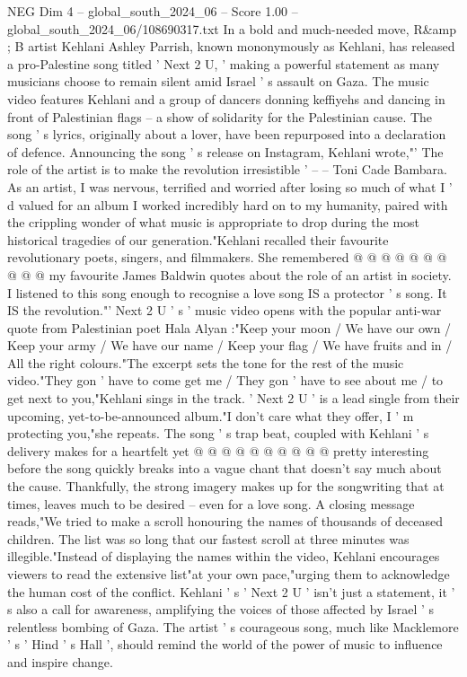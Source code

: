 \begin{textsample}{NEG Dim 4 – global\_south\_2024\_06 – Score 1.00 – global\_south\_2024\_06/108690317.txt}  \label{ex:f4_neg_372}
In a bold and much-needed move, R\&amp ; B artist Kehlani Ashley Parrish, known mononymously as Kehlani, has released a pro-Palestine song titled ' Next 2 U, ' making a powerful statement as many musicians choose to remain silent amid Israel ' s assault on Gaza.
The music video features Kehlani and a group of dancers donning keffiyehs and dancing in front of Palestinian flags -- a show of solidarity for the Palestinian cause.
The song ' s lyrics, originally about a lover, have been repurposed into a declaration of defence.
Announcing the song ' s release on Instagram, Kehlani wrote,"' The role of the artist is to make the revolution irresistible ' -- -- Toni Cade Bambara.
As an artist, I was nervous, terrified and worried after losing so much of what I ' d valued for an album I worked incredibly hard on to my humanity, paired with the crippling wonder of what music is appropriate to drop during the most historical tragedies of our generation."Kehlani recalled their favourite revolutionary poets, singers, and filmmakers.
She remembered @ @ @ @ @ @ @ @ @ @ my favourite James Baldwin quotes about the role of an artist in society.
I listened to this song enough to recognise a love song IS a protector ' s song.
It IS the revolution."' Next 2 U ' s ' music video opens with the popular anti-war quote from Palestinian poet Hala Alyan :"Keep your moon / We have our own / Keep your army / We have our name / Keep your flag / We have fruits and in / All the right colours."The excerpt sets the tone for the rest of the music video."They gon ' have to come get me / They gon ' have to see about me / to get next to you,"Kehlani sings in the track. ' Next 2 U ' is a lead single from their upcoming, yet-to-be-announced album."I don't care what they offer, I ' m protecting you,"she repeats.
The song ' s trap beat, coupled with Kehlani ' s delivery makes for a heartfelt yet @ @ @ @ @ @ @ @ @ @ pretty interesting before the song quickly breaks into a vague chant that doesn't say much about the cause.
Thankfully, the strong imagery makes up for the songwriting that at times, leaves much to be desired -- even for a love song.
A closing message reads,"We tried to make a scroll honouring the names of thousands of deceased children.
The list was so long that our fastest scroll at three minutes was illegible."Instead of displaying the names within the video, Kehlani encourages viewers to read the extensive list"at your own pace,"urging them to acknowledge the human cost of the conflict.
Kehlani ' s ' Next 2 U ' isn't just a statement, it ' s also a call for awareness, amplifying the voices of those affected by Israel ' s relentless bombing of Gaza.
The artist ' s courageous song, much like Macklemore ' s ' Hind ' s Hall ', should remind the world of the power of music to influence and inspire change.

\end{textsample}

